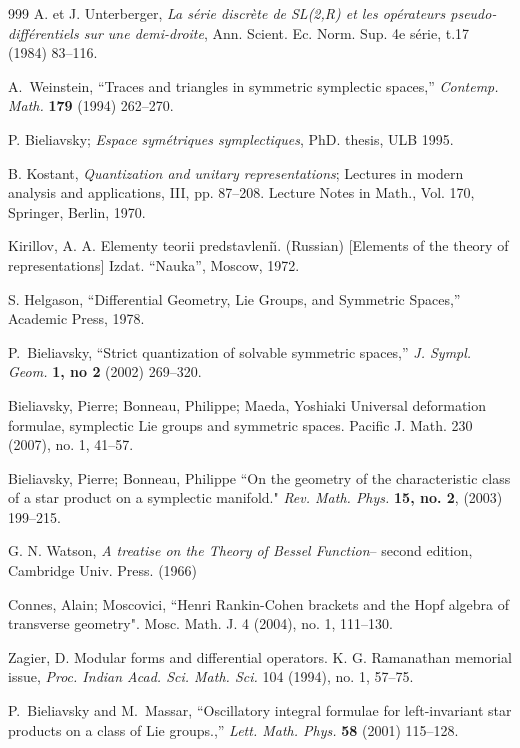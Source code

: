 \documentclass{article}
\begin{document}
\begin{thebibliography}{999}
 A. et J. Unterberger, {\sl La s\'erie discr\`ete de SL(2,R) et les op\'erateurs
pseudo-diff\'erentiels sur une demi-droite},  Ann. Scient. Ec. Norm. Sup. 4e s\'erie, t.17
(1984) 83--116.
         
A.~Weinstein, ``Traces and triangles in symmetric symplectic spaces,'' {\em
  Contemp. Math.} {\bf 179} (1994) 262--270.
  
  P. Bieliavsky; {\sl Espace sym\'etriques symplectiques}, PhD. thesis, ULB 1995.

 B. Kostant, {\sl Quantization and unitary representations};  Lectures in modern analysis and applications, III,  pp. 87--208. Lecture Notes in Math., Vol. 170, Springer, Berlin, 1970. 

 { Kirillov, A. A.} {Elementy teorii predstavleni\u\i.} (Russian) [Elements of the theory of representations] Izdat. ``Nauka'', Moscow, 1972. 

 S. Helgason, ``Differential Geometry, Lie Groups, and
Symmetric Spaces,'' Academic Press, 1978.

P.~Bieliavsky, ``Strict quantization of solvable symmetric spaces,'' {\em J.
  Sympl. Geom.} {\bf 1, no 2} (2002)
269--320.

 Bieliavsky, Pierre; Bonneau, Philippe; Maeda, Yoshiaki Universal deformation formulae, symplectic Lie groups and symmetric spaces.  Pacific J. Math.  230  (2007),  no. 1, 41--57.

 Bieliavsky, Pierre; Bonneau, Philippe ``On the geometry of the characteristic class of a star product on a symplectic manifold."  {\em Rev. Math. Phys.}  {\bf 15,   no. 2},  (2003) 199--215.

  G. N. Watson, {\sl A treatise on the Theory of Bessel Function}-- second edition, Cambridge Univ. Press. (1966)
 
  Connes, Alain; Moscovici, ``Henri Rankin-Cohen brackets and the Hopf algebra of transverse geometry".  Mosc. Math. J.  4  (2004),  no. 1, 111--130. 

Zagier, D. Modular forms and differential operators. K. G.
Ramanathan memorial issue,  {\em Proc. Indian Acad. Sci. Math. Sci.}
104 (1994),  no. 1, 57--75.

P.~Bieliavsky and M.~Massar, ``Oscillatory integral formulae for left-invariant
  star products on a class of {L}ie groups.,'' {\em Lett. Math. Phys.} {\bf 58}
  (2001) 115--128.
  





 
 
 
 

         
 \end{thebibliography}


%


\end{document}
